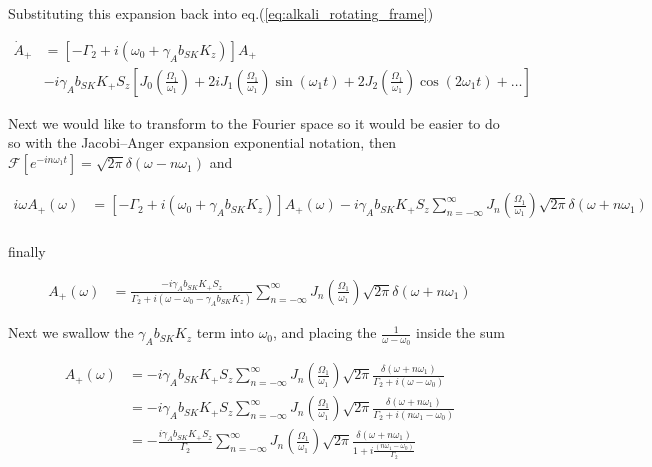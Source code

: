 \documentclass{article}
\begin{document}
Substituting this expansion back into eq.(\ref{eq:alkali_rotating_frame})

\begin{align}
    \dot{A}_+  &= \left[-\Gamma_2 + i\left(\omega_0 + \gamma_{A}b_{SK}K_z\right) \right]A_+ \\ &- i \gamma_{A}b_{SK}K_+ S_z \left[J_0\left(\frac{\Omega_1}{\omega_1}\right)+ 2i J_{1}\left(\frac{\Omega_1}{\omega_1}\right)\sin{\left(\omega_1 t\right)}+2 J_{2}\left(\frac{\Omega_1}{\omega_1}\right)\cos{\left(2\omega_1 t\right)}+\dots\right]
\end{align}
 
Next we would like to transform to the Fourier space so it would be easier to do so with the Jacobi–Anger expansion exponential notation, then $\mathcal{F}\left[e^{-in\omega_1 t}\right] = \sqrt{2\pi}\delta \left(\omega - n\omega_1\right)$ and

\begin{align}
    i\omega A_+\left(\omega\right)  &= \left[-\Gamma_2 + i\left(\omega_0 + \gamma_{A}b_{SK}K_z\right) \right]A_+\left(\omega\right)  - i \gamma_{A}b_{SK}K_+ S_z \sum_{n=-\infty}^{\infty}J_n\left(\frac{\Omega_1}{\omega_1}\right)\sqrt{2\pi}\delta \left(\omega + n\omega_1\right)\\
\end{align}

finally

\begin{align}
     A_+\left(\omega\right)  &= \frac{-i \gamma_{A}b_{SK}K_+ S_z}{\Gamma_2 + i\left(\omega - \omega_0 - \gamma_{A}b_{SK}K_z\right) } \sum_{n=-\infty}^{\infty}J_n\left(\frac{\Omega_1}{\omega_1}\right)\sqrt{2\pi}\delta \left(\omega + n\omega_1\right)
\end{align}

Next we swallow the $\gamma_{A}b_{SK}K_z$ term into $\omega_0$, and placing the $\frac{1}{\omega-\omega_0}$ inside the sum

\begin{align}
     A_+\left(\omega\right)  &= -i \gamma_{A}b_{SK}K_+ S_z \sum_{n=-\infty}^{\infty}J_n\left(\frac{\Omega_1}{\omega_1}\right)\sqrt{2\pi} \frac{\delta\left(\omega + n\omega_1\right)}{\Gamma_2 + i\left(\omega - \omega_0\right)}\\
      &= -i \gamma_{A}b_{SK}K_+ S_z \sum_{n=-\infty}^{\infty}J_n\left(\frac{\Omega_1}{\omega_1}\right)\sqrt{2\pi} \frac{\delta\left(\omega + n\omega_1\right)}{\Gamma_2 + i\left(n\omega_1 - \omega_0\right)}\\
      &= -\frac{i \gamma_{A}b_{SK}K_+ S_z}{\Gamma_2} \sum_{n=-\infty}^{\infty}J_n\left(\frac{\Omega_1}{\omega_1}\right)\sqrt{2\pi} \frac{\delta\left(\omega + n\omega_1\right)}{1 + i\frac{\left(n\omega_1 - \omega_0\right)}{\Gamma_2}}
\end{align}
\end{document}
